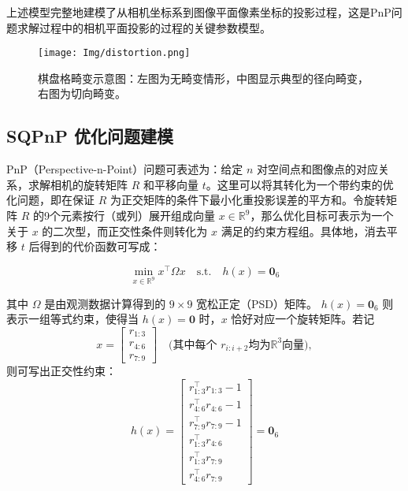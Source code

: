 上述模型完整地建模了从相机坐标系到图像平面像素坐标的投影过程，这是PnP问题求解过程中的相机平面投影的过程的关键参数模型。

\begin{figure}[htbp]
	\centering
	\texttt{[image: Img/distortion.png]}
	\caption{棋盘格畸变示意图：左图为无畸变情形，中图显示典型的径向畸变，右图为切向畸变。}
	\label{fig:distortion_patterns}
\end{figure}

\subsection{SQPnP 优化问题建模}
PnP（Perspective-n-Point）问题可表述为：给定 $n$ 对空间点和图像点的对应关系，求解相机的旋转矩阵 $R$ 和平移向量 $t$。这里可以将其转化为一个带约束的优化问题，即在保证 $R$ 为正交矩阵的条件下最小化重投影误差的平方和。令旋转矩阵 $R$ 的9个元素按行（或列）展开组成向量 $x \in \mathbb{R}^9$，那么优化目标可表示为一个关于 $x$ 的二次型，而正交性条件则转化为 $x$ 满足的约束方程组。具体地，消去平移 $t$ 后得到的代价函数可写成：

\begin{equation}
	\min_{x \in \mathbb{R}^9}   x^\top \Omega x
	\quad \text{s.t.} \quad
	h(x) = \mathbf{0}_6
\end{equation}

其中 $\Omega$ 是由观测数据计算得到的 $9 \times 9$ 宽松正定（PSD）矩阵。  
$h(x) = \mathbf{0}_6$ 则表示一组等式约束，使得当 $h(x)=\mathbf{0}$ 时，$x$ 恰好对应一个旋转矩阵。若记
\begin{equation}
	x = 
	\begin{bmatrix}
		r_{1:3} \\[2pt]
		r_{4:6} \\[2pt]
		r_{7:9}
	\end{bmatrix}
	\quad\text{(其中每个 }r_{i:i+2}\text{均为}\mathbb{R}^3\text{向量)},
\end{equation}
则可写出正交性约束：
\begin{equation}
	h(x)  = 
	\begin{bmatrix}
		r_{1:3}^\top r_{1:3}  -  1 \\
		r_{4:6}^\top r_{4:6}  -  1 \\
		r_{7:9}^\top r_{7:9}  -  1 \\
		r_{1:3}^\top r_{4:6} \\
		r_{1:3}^\top r_{7:9} \\
		r_{4:6}^\top r_{7:9}
	\end{bmatrix}
	= 
	\mathbf{0}_6 
\end{equation}
